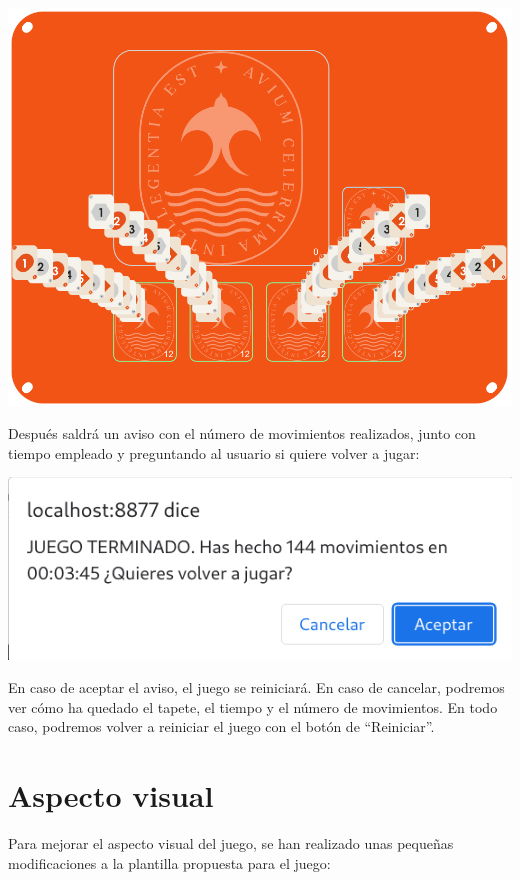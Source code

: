 \documentclass{\ClassPath/viu-tfm-template}
\begin{document}
\vspace{-1em}
\begin{center}
    \includegraphics[width=0.8\linewidth]{img/final.png}
\end{center}
\vspace{-1em}

Después saldrá un aviso con el número de movimientos realizados, junto con tiempo empleado y preguntando al usuario si quiere volver a jugar:

\vspace{-1em}
\begin{center}
    \includegraphics[frame,width=0.3\linewidth]{img/aviso.png}
\end{center}
\vspace{-1em}

En caso de aceptar el aviso, el juego se reiniciará. En caso de cancelar, podremos ver cómo ha quedado el tapete, el tiempo y el número de movimientos. En todo caso, podremos volver a reiniciar el juego con el botón de “Reiniciar”.

\chapter{Aspecto visual}
Para mejorar el aspecto visual del juego, se han realizado unas pequeñas modificaciones a la plantilla propuesta para el juego:
\end{document}
